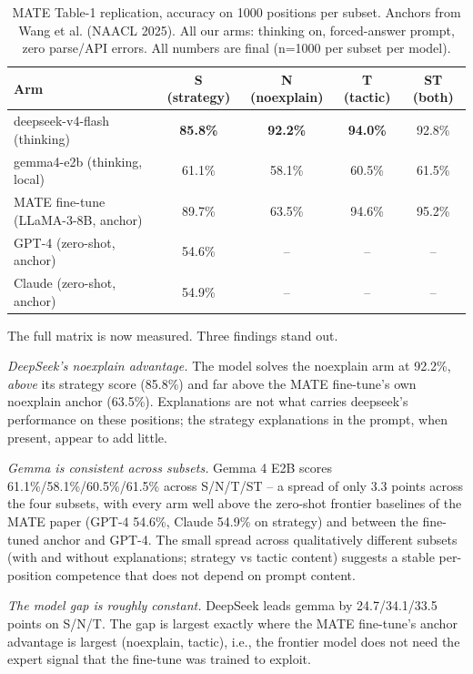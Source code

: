 \documentclass{article}
\begin{document}
\begin{table}[h]
\centering
\small
\begin{tabular}{lcccc}
\hline
Arm & S (strategy) & N (noexplain) & T (tactic) & ST (both) \\ \hline
deepseek-v4-flash (thinking) & \textbf{85.8\%} & \textbf{92.2\%} &
  \textbf{94.0\%} & 92.8\% \\
gemma4-e2b (thinking, local) & 61.1\% & 58.1\% & 60.5\% &
  61.5\% \\
MATE fine-tune (LLaMA-3-8B, anchor) & 89.7\% & 63.5\% & 94.6\% & 95.2\% \\
GPT-4 (zero-shot, anchor) & 54.6\% & -- & -- & -- \\
Claude (zero-shot, anchor) & 54.9\% & -- & -- & -- \\ \hline
\end{tabular}
\caption{MATE Table-1 replication, accuracy on 1000 positions per
subset. Anchors from Wang et al. (NAACL 2025). All our arms: thinking on,
forced-answer prompt, zero parse/API errors. All numbers are final
(n=1000 per subset per model).}
\label{tab:campaign}
\end{table}

The full matrix is now measured. Three findings stand out.

\emph{DeepSeek's noexplain advantage.} The model solves the noexplain
arm at 92.2\%, \emph{above} its strategy score (85.8\%) and far above
the MATE fine-tune's own noexplain anchor (63.5\%). Explanations are
not what carries deepseek's performance on these positions; the
strategy explanations in the prompt, when present, appear to add
little.

\emph{Gemma is consistent across subsets.} Gemma 4 E2B scores
61.1\%/58.1\%/60.5\%/61.5\% across S/N/T/ST -- a spread of only
3.3 points across the four subsets, with every arm well above the
zero-shot frontier baselines of the MATE paper (GPT-4 54.6\%, Claude
54.9\% on strategy) and between the fine-tuned anchor and GPT-4. The
small spread across qualitatively different subsets (with and without
explanations; strategy vs tactic content) suggests a stable
per-position competence that does not depend on prompt content.

\emph{The model gap is roughly constant.} DeepSeek leads gemma by
24.7/34.1/33.5 points on S/N/T. The gap is largest exactly where the
MATE fine-tune's anchor advantage is largest (noexplain, tactic),
i.e., the frontier model does not need the expert signal that the
fine-tune was trained to exploit.
\end{document}
